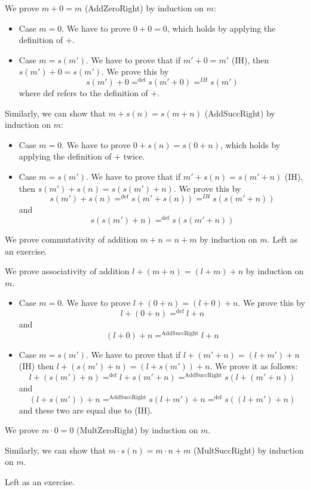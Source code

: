 \begin{example}
We prove $m+0=m$ (AddZeroRight) by induction on $m$:
\begin{itemize}
  \item Case $m=0$. We have to prove $0+0=0$, which holds by applying the definition of $+$.
  \item Case $m=s(m')$. We have to prove that if $m'+0=m'$ (IH), then $s(m')+0=s(m')$.
   We prove this by
    \[s(m')+0=^{\mathrm{def}}s(m'+0)=^{IH}s(m')\]
   where $\mathrm{def}$ refers to the definition of $+$.
\end{itemize}

Similarly, we can show that $m+s(n)=s(m+n)$ (AddSuccRight) by induction on $m$:
\begin{itemize}
  \item Case $m=0$. We have to prove $0+s(n)=s(0+n)$, which holds by applying the definition of $+$ twice.
  \item Case $m=s(m')$. We have to prove that if $m'+s(n)=s(m'+n)$ (IH), then $s(m')+s(n)=s(s(m')+n)$.
   We prove this by
    \[s(m')+s(n)=^{\mathrm{def}}s(m'+s(n))=^{IH}s(s(m'+n))\]
   and
   \[s(s(m')+n)=^{\mathrm{def}}s(s(m'+n))\]
\end{itemize}
\end{example}

\begin{example}
We prove commutativity of addition $m+n=n+m$ by induction on $m$.
Left as an exercise.
\end{example}

\begin{example}
We prove associativity of addition $l+(m+n)=(l+m)+n$ by induction on $m$.
\begin{itemize}
 \item Case $m=0$. We have to prove $l+(0+n)=(l+0)+n$.
   We prove this by
    \[l+(0+n)=^{\mathrm{def}}l+n\]
   and
   \[(l+0)+n=^{\mathrm{AddSuccRight}}l+n\]
 \item Case $m=s(m')$. We have to prove that if $l+(m'+n)=(l+m')+n$ (IH) then $l+(s(m')+n)=(l+s(m'))+n$.
   We prove it as follows:
    \[l+(s(m')+n)=^{\mathrm{def}} l+s(m'+n) =^{\mathrm{AddSuccRight}} s(l+(m'+n))\]
   and
    \[(l+s(m'))+n=^{\mathrm{AddSuccRight}} s(l+m')+n =^{\mathrm{def}} s((l+m')+n)\]
   and these two are equal due to (IH).
\end{itemize}
\end{example}

\begin{example}
We prove $m\cdot 0=0$ (MultZeroRight) by induction on $m$.

Similarly, we can show that $m\cdot s(n)=m\cdot n+m$ (MultSuccRight) by induction on $m$.

Left as an exercise.
\end{example}

